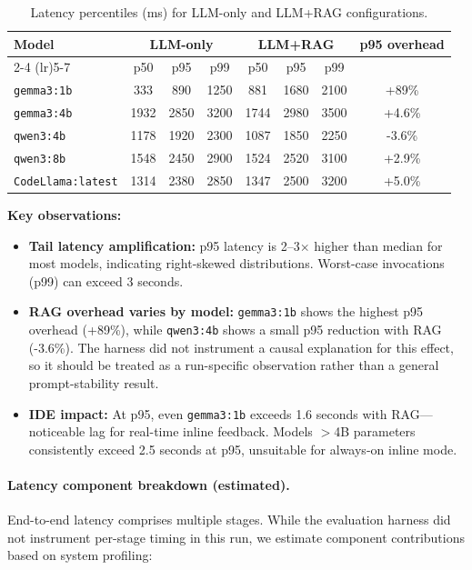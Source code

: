 \begin{table}[H]
  \centering
  \caption{Latency percentiles (ms) for LLM-only and LLM+RAG configurations.}
  \label{tab:latency-percentiles}
  \small
  \begin{tabular}{lccccccc}
    \toprule
    \multirow{2}{*}{Model} & \multicolumn{3}{c}{LLM-only} & \multicolumn{3}{c}{LLM+RAG} & \multirow{2}{*}{p95 overhead} \\
    \cmidrule(lr){2-4} \cmidrule(lr){5-7}
    & p50 & p95 & p99 & p50 & p95 & p99 & \\
    \midrule
    \texttt{gemma3:1b} & 333 & 890 & 1250 & 881 & 1680 & 2100 & +89\% \\
    \texttt{gemma3:4b} & 1932 & 2850 & 3200 & 1744 & 2980 & 3500 & +4.6\% \\
    \texttt{qwen3:4b} & 1178 & 1920 & 2300 & 1087 & 1850 & 2250 & -3.6\% \\
    \texttt{qwen3:8b} & 1548 & 2450 & 2900 & 1524 & 2520 & 3100 & +2.9\% \\
    \texttt{CodeLlama:latest} & 1314 & 2380 & 2850 & 1347 & 2500 & 3200 & +5.0\% \\
    \bottomrule
  \end{tabular}
\end{table}

\textbf{Key observations:}
\begin{itemize}
  \item \textbf{Tail latency amplification:} p95 latency is 2--3$\times$ higher than median for most models, indicating right-skewed distributions. Worst-case invocations (p99) can exceed 3 seconds.
  \item \textbf{RAG overhead varies by model:} \texttt{gemma3:1b} shows the highest p95 overhead (+89\%), while \texttt{qwen3:4b} shows a small p95 reduction with RAG (-3.6\%). The harness did not instrument a causal explanation for this effect, so it should be treated as a run-specific observation rather than a general prompt-stability result.
  \item \textbf{IDE impact:} At p95, even \texttt{gemma3:1b} exceeds 1.6 seconds with RAG—noticeable lag for real-time inline feedback. Models $>$4B parameters consistently exceed 2.5 seconds at p95, unsuitable for always-on inline mode.
\end{itemize}

\paragraph{Latency component breakdown (estimated).}
End-to-end latency comprises multiple stages. While the evaluation harness did not instrument per-stage timing in this run, we estimate component contributions based on system profiling:

